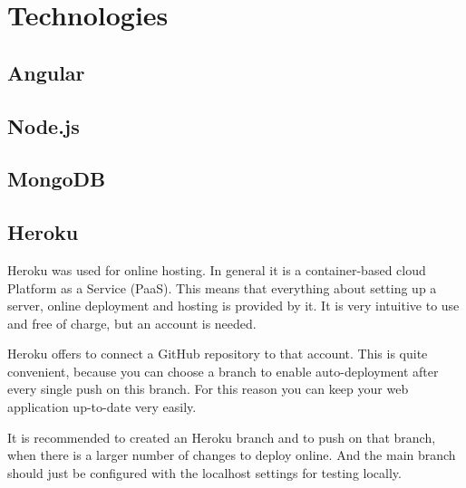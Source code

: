 \chapter{Technologies}
\label{chap:Tech}

\section{Angular}


\section{Node.js}


\section{MongoDB}


\section{Heroku}

Heroku was used for online hosting. In general it is a container-based 
cloud Platform as a Service (PaaS). This means that everything about 
setting up a server, online deployment and hosting is provided by it. It 
is very intuitive to use and free of charge, but an account is needed. 

Heroku offers to connect a GitHub repository to that account. This is 
quite convenient, because you can choose a branch to enable 
auto-deployment after every single push on this branch. For this reason 
you can keep your web application up-to-date very easily. 

It is recommended to created an Heroku branch and to push on that 
branch, when there is a larger number of changes to deploy online. 
And the main branch should just be configured with the localhost 
settings for testing locally.

